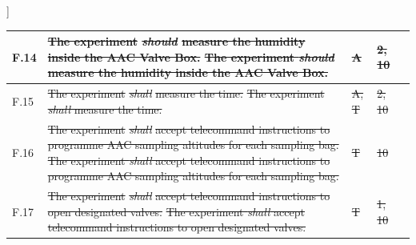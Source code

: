 ]\documentclass[a4paper,12pt,twoside]{article}
\providecommand{\DIFaddtex}[1]{{\protect\color{blue}\uwave{#1}}} %
\providecommand{\DIFdeltex}[1]{{\protect\color{red}\sout{#1}}}                      %
\providecommand{\DIFaddbegin}{} %
\providecommand{\DIFaddend}{} %
\providecommand{\DIFdelbegin}{} %
\providecommand{\DIFdelend}{} %
\providecommand{\DIFadd}[1]{\texorpdfstring{\DIFaddtex{#1}}{#1}} %
\providecommand{\DIFdel}[1]{\texorpdfstring{\DIFdeltex{#1}}{}} %
\newcommand{\DIFscaledelfig}{0.5}
\newlength{\DIFdelgraphicswidth} %
\newlength{\DIFdelgraphicsheight} %
\newcommand{\DIFaddincludegraphics}[2][]{{\color{blue}\fbox{\DIFOincludegraphics[#1]{#2}}}} %
\newcommand{\DIFdelincludegraphics}[2][]{%
\sbox{\DIFdelgraphicsbox}{\DIFOincludegraphics[#1]{#2}}%
\settoboxwidth{\DIFdelgraphicswidth}{\DIFdelgraphicsbox} %
\settoboxtotalheight{\DIFdelgraphicsheight}{\DIFdelgraphicsbox} %
\scalebox{\DIFscaledelfig}{%
\parbox[b]{\DIFdelgraphicswidth}{\usebox{\DIFdelgraphicsbox}\\[-\baselineskip] \rule{\DIFdelgraphicswidth}{0em}}\llap{\resizebox{\DIFdelgraphicswidth}{\DIFdelgraphicsheight}{%
\setlength{\unitlength}{\DIFdelgraphicswidth}%
\begin{picture}(1,1)%
\thicklines\linethickness{2pt} %
{\color[rgb]{1,0,0}\put(0,0){\framebox(1,1){}}}%
{\color[rgb]{1,0,0}\put(0,0){\line( 1,1){1}}}%
{\color[rgb]{1,0,0}\put(0,1){\line(1,-1){1}}}%
\end{picture}%
}\hspace*{3pt}}} %
} %
\DeclareRobustCommand{\DIFaddbegin}{\DIFOaddbegin \let\includegraphics\DIFaddincludegraphics} %
\DeclareRobustCommand{\DIFaddend}{\DIFOaddend \let\includegraphics\DIFOincludegraphics} %
\DeclareRobustCommand{\DIFdelbegin}{\DIFOdelbegin \let\includegraphics\DIFdelincludegraphics} %
\DeclareRobustCommand{\DIFdelend}{\DIFOaddend \let\includegraphics\DIFOincludegraphics} %
\begin{document}
\begin{longtable}[]{|m{}| m{} |m{} |m{}|m{}|}
F.14 & \DIFdelbegin \DIFdel{The experiment }\textit{\DIFdel{should}} %
\DIFdel{measure the humidity inside the AAC Valve Box.                                                                                                    }\DIFdelend \DIFaddbegin \st{The experiment \textit{should} measure the humidity inside the AAC Valve Box.}\DIFadd{\textsuperscript{\ref{fn:unnecessary-requirement}}                                                                                                     }\DIFaddend &      \DIFdelbegin \DIFdel{A        }\DIFdelend \DIFaddbegin \DIFadd{-        }\DIFaddend & \DIFdelbegin \DIFdel{2, 10            }\DIFdelend \DIFaddbegin \DIFadd{-            }\DIFaddend &        \\ \hline
F.15 & \DIFdelbegin \DIFdel{The experiment }\textit{\DIFdel{shall}} %
\DIFdel{measure the time.                                                                                                                                  }\DIFdelend \DIFaddbegin \st{The experiment \textit{shall} measure the time.} \DIFadd{\textsuperscript{\ref{fn:unverifiable-requirement}}                                                                                                                                  }\DIFaddend &        \DIFdelbegin \DIFdel{A, T      }\DIFdelend \DIFaddbegin \DIFadd{-     }\DIFaddend & \DIFdelbegin \DIFdel{2, 10            }\DIFdelend \DIFaddbegin \DIFadd{-            }\DIFaddend &        \\ \hline
F.16 & \DIFdelbegin \DIFdel{The experiment }\textit{\DIFdel{shall}} %
\DIFdel{accept telecommand instructions to programme AAC sampling altitudes for each sampling bag.                                                         }\DIFdelend \DIFaddbegin \st{The experiment \textit{shall} accept telecommand instructions to programme AAC sampling altitudes for each sampling bag.}\DIFadd{\textsuperscript{\ref{fn:unnecessary-requirement}}                                                          }\DIFaddend &      \DIFdelbegin \DIFdel{T        }\DIFdelend \DIFaddbegin \DIFadd{-        }\DIFaddend & \DIFdelbegin \DIFdel{10            }\DIFdelend \DIFaddbegin \DIFadd{-           }\DIFaddend &        \\ \hline
F.17 & \DIFdelbegin \DIFdel{The experiment }\textit{\DIFdel{shall}} %
\DIFdel{accept telecommand instructions to open designated valves.                                                                                         }\DIFdelend \DIFaddbegin \st{The experiment \textit{shall} accept telecommand instructions to open designated valves.}\DIFadd{\textsuperscript{\ref{fn:unnecessary-requirement}}                                                                                          }\DIFaddend &      \DIFdelbegin \DIFdel{T        }\DIFdelend \DIFaddbegin \DIFadd{-      }\DIFaddend & \DIFdelbegin \DIFdel{1, 10            }\DIFdelend \DIFaddbegin \DIFadd{-        }\DIFaddend &        \\ \hline

\end{longtable}
\end{document}
